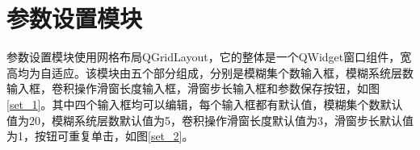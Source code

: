 \documentclass[cn,11pt,chinese]{elegantbook}
\begin{document}
\section{参数设置模块}

参数设置模块使用网格布局QGridLayout，它的整体是一个QWidget窗口组件，宽高均为自适应。该模块由五个部分组成，分别是模糊集个数输入框，模糊系统层数输入框，卷积操作滑窗长度输入框，滑窗步长输入框和参数保存按钮，如图\ref{set_1}。其中四个输入框均可以编辑，每个输入框都有默认值，模糊集个数默认值为20，模糊系统层数默认值为5，卷积操作滑窗长度默认值为3，滑窗步长默认值为1，按钮可重复单击，如图\ref{set_2}。

\begin{figure}
	\centering
\end{figure}
\end{document}
